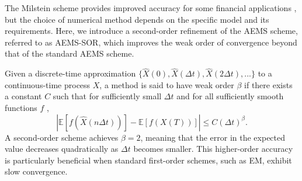 \documentclass[graybox]{svmult}
\begin{document}
The Milstein scheme provides improved accuracy for some financial applications \cite{giles2013analysis}, but the choice of numerical method depends on the specific model and its requirements. Here, we introduce a second-order refinement of the AEMS scheme, referred to as AEMS-SOR, which improves the weak order of convergence beyond that of the standard AEMS scheme. 

Given a discrete-time approximation $\{\hat{X}(0), \hat{X}(\Delta t), \hat{X}(2\Delta t),...\}$ to a continuous-time process $X$, a method is said to have weak order $\beta$ if there exists a constant $C$ such that for sufficiently small $\Delta t$ and for all sufficiently smooth functions $f$ \cite{glasserman2004monte},
\begin{equation*}
    \left| \mathbb{E}[f(\hat{X}(n\Delta t))] - \mathbb{E}[f(X(T))] \right| \leq C (\Delta t)^\beta.
\end{equation*}
A second-order scheme achieves $\beta = 2$, meaning that the error in the expected value decreases quadratically as $\Delta t$ becomes smaller. This higher-order accuracy is particularly beneficial when standard first-order schemes, such as EM, exhibit slow convergence.
\end{document}
